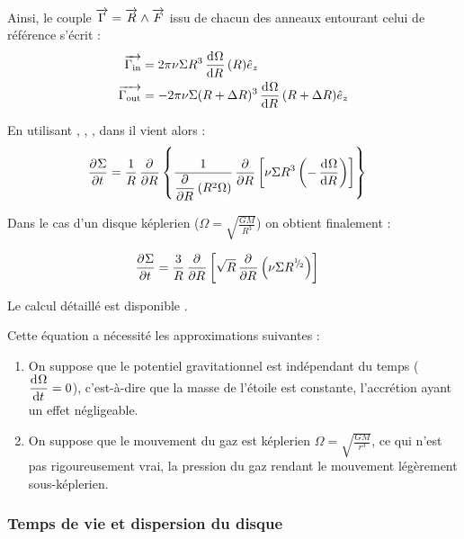 \bigskip

Ainsi, le couple ${\overrightarrow{\Gamma}}={\overrightarrow{R}}\wedge{\overrightarrow{F}}$ issu de chacun des anneaux entourant celui de référence s'écrit :
\begin{subequations}
\begin{align}
{\overrightarrow{\Gamma_\text{in}}} &= 2\pi\nu \Sigma R^3 \mathinner{ \dfrac{\operatorname{d \!}{^{}}\Omega}{\operatorname{d \!}{{R}^{}}} }(R) \hat{e}_z\label{eq:G_in}\\
{\overrightarrow{\Gamma_\text{out}}} &= -2\pi\nu \Sigma (R+\Delta R)^3 \mathinner{ \dfrac{\operatorname{d \!}{^{}}\Omega}{\operatorname{d \!}{{R}^{}}} }(R+\Delta R) \hat{e}_z\label{eq:G_out}
\end{align}\label{eq:J_torques}
\end{subequations}

\bigskip

En utilisant , , , dans  il vient alors :
\begin{align}
\mathinner{ \dfrac{\partial{^{}}\Sigma}{\partial{{t}^{}}} } &= \frac{1}{R}\mathinner{ \dfrac{\partial{^{}}}{\partial{{R}^{}}} }\left\{\frac{1}{\mathinner{ \dfrac{\partial{^{}}}{\partial{{R}^{}}} }\left(R^2\Omega\right)} \mathinner{ \dfrac{\partial{^{}}}{\partial{{R}^{}}} }\left[\nu \Sigma R^3 \left(-\mathinner{ \dfrac{\operatorname{d \!}{^{}}\Omega}{\operatorname{d \!}{{R}^{}}} }\right)\right]\right\}
\end{align}

Dans le cas d'un disque képlerien ($\Omega = \sqrt{\frac{GM}{R^3}}$) on obtient finalement :
\begin{important}
\begin{align}
\mathinner{ \dfrac{\partial{^{}}\Sigma}{\partial{{t}^{}}} } &=\frac{3}{R}\mathinner{ \dfrac{\partial{^{}}}{\partial{{R}^{}}} }\left[\sqrt{R} \mathinner{ \dfrac{\partial{^{}}}{\partial{{R}^{}}} }\left(\nu \Sigma R^{{}^{1\!\!}/ _{\!2}}\right)\right]\label{eq:diffusion_equation}
\end{align}
\end{important}

Le calcul détaillé est disponible .

Cette équation a nécessité les approximations suivantes : 
\begin{enumerate}
\item On suppose que le potentiel gravitationnel est indépendant du temps ($\mathinner{ \dfrac{\operatorname{d \!}{^{}}\Omega}{\operatorname{d \!}{{t}^{}}} }=0$), c'est-à-dire que la masse de l'étoile est constante, l'accrétion ayant un effet négligeable.
\item On suppose que le mouvement du gaz est képlerien $\Omega=\sqrt{\frac{GM}{r^3}}$, ce qui n'est pas rigoureusement vrai, la pression du gaz rendant le mouvement légèrement sous-képlerien.
\end{enumerate}

\subsubsection{Temps de vie et dispersion du disque}\label{sec:dispersion}


